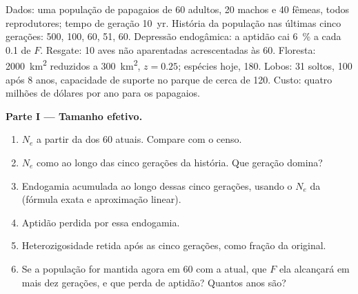 \begin{problem}
\label{pb:b3:conservation-biology:1}
Dados: uma população de papagaios de 60 adultos, 20 machos e 40 fêmeas,
todos reprodutores; tempo de geração \qty{10}{yr}. História da população
nas últimas cinco gerações: 500, 100, 60, 51, 60. Depressão endogâmica: a
aptidão cai \qty{6}{\%} a cada \qty{0.1}{} de $F$. Resgate: 10 aves não
aparentadas acrescentadas às 60. Floresta: \qty{2000}{km^2} reduzidos a
\qty{300}{km^2}, $z = 0.25$; espécies hoje, 180. Lobos: 31 soltos, 100
após 8 anos, capacidade de suporte no parque de cerca de 120. Custo:
quatro milhões de dólares por ano para os papagaios.

\medskip
\noindent\textbf{Parte I --- Tamanho efetivo.}
\begin{enumerate}
  \item $N_{e}$ a partir da  dos 60 atuais. Compare com o
        censo.
  \item $N_{e}$ como  ao longo das cinco gerações da
        história. Que geração domina?
  \item Endogamia acumulada ao longo dessas cinco gerações, usando o
        $N_{e}$ da  (fórmula exata e aproximação linear).
  \item Aptidão perdida por essa endogamia.
  \item Heterozigosidade retida após as cinco gerações, como fração da
        original.
  \item Se a população for mantida agora em 60 com a  atual,
        que $F$ ela alcançará em mais dez gerações, e que perda de
        aptidão? Quantos anos são?
\end{enumerate}


\end{problem}
